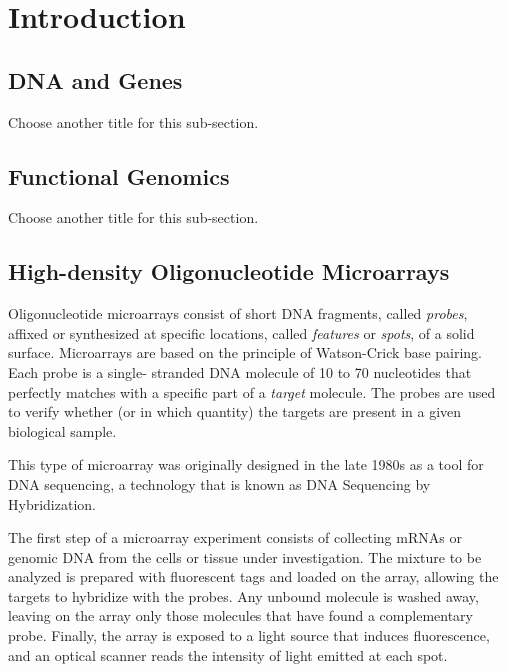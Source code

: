 \chapter{Introduction}
\label{ch:intro}

\section{DNA and Genes}
\label{sec:intro_genes}

Choose another title for this sub-section.

\section{Functional Genomics}
\label{sec:intro_funcgen}

Choose another title for this sub-section.

\section{High-density Oligonucleotide Microarrays}
\label{sec:intro_oligoarrays}

Oligonucleotide microarrays consist of short DNA fragments, called
\emph{probes}, affixed or synthesized at specific locations, called \emph{
features} or \emph{spots}, of a solid surface. Microarrays are based on the
principle of Watson-Crick base pairing. Each probe is a single- stranded DNA
molecule of 10 to 70 nucleotides that perfectly matches with a specific part of
a \emph{target} molecule. The probes are used to verify whether (or in which
quantity) the targets are present in a given biological sample.

This type of microarray was originally designed in the late 1980s as a tool for
DNA sequencing, a technology that is known as DNA Sequencing by Hybridization.

The first step of a microarray experiment consists of collecting mRNAs
or genomic DNA from the cells or tissue under investigation. The mixture
to be analyzed is prepared with fluorescent tags and loaded on the array,
allowing
the targets to hybridize with the probes. Any unbound molecule is
washed away, leaving on the array only those molecules that have found
a complementary probe. Finally, the array is exposed to a light source
that induces fluorescence, and an optical scanner reads the intensity
of light emitted at each spot.

